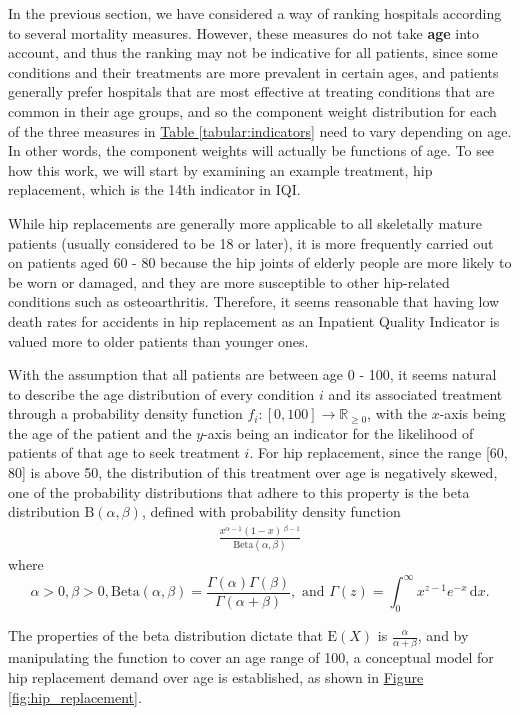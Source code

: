 \documentclass{article}
\begin{document}
In the previous section, we have considered a way of ranking hospitals according to several mortality measures. However, these measures do not take \textbf{age} into account, and thus the ranking may not be indicative for all patients, since some conditions and their treatments are more prevalent in certain ages, and patients generally prefer hospitals that are most effective at treating conditions that are common in their age groups, and so the component weight distribution for each of the three measures in \hyperref[tabular:indicators]{Table \ref*{tabular:indicators}} need to vary depending on age. In other words, the component weights will actually be functions of age. To see how this work, we will start by examining an example treatment, hip replacement, which is the 14th indicator in IQI.

While hip replacements are generally more applicable to all skeletally mature patients (usually considered to be 18 or later), it is more frequently carried out on patients aged 60 - 80 because the hip joints of elderly people are more likely to be worn or damaged, and they are more susceptible to other hip-related conditions such as osteoarthritis. Therefore, it seems reasonable that having low death rates for accidents in hip replacement as an Inpatient Quality Indicator is valued more to older patients than younger ones.

With the assumption that all patients are between age 0 - 100, it seems natural to describe the age distribution of every condition $i$ and its associated treatment through a probability density function $f_i : [0,100] \to \mathbb{R}_{\ge 0}$, with the $x$-axis being the age of the patient and the $y$-axis being an indicator for the likelihood of patients of that age to seek treatment $i$. For hip replacement, since the range [60, 80] is above 50, the distribution of this treatment over age is negatively skewed, one of the probability distributions that adhere to this property is the beta distribution $\mathrm{B}\left(\alpha, \beta\right)$, defined with probability density function
\begin{gather}\frac{x^{\alpha-1}(1-x)\,^{\beta-1}}{\mathrm{Beta}\left(\alpha,\beta\right)}\end{gather}
where
$$\alpha > 0, \beta > 0, \mathrm{Beta}\left(\alpha, \beta\right) = \frac{\Gamma\left(\alpha\right) \Gamma\left(\beta\right)}{\Gamma\left(\alpha + \beta\right)}, \text{ and } \Gamma(z) = \int_0^\infty x^{z-1}e^{-x}\,\mathrm{d}x.$$

The properties of the beta distribution dictate that $\mathrm{E}(X)$ is $\frac{\alpha}{\alpha + \beta}$, and by manipulating the function to cover an age range of 100, a conceptual model for hip replacement demand over age is established, as shown in \hyperref[fig:hip_replacement]{Figure \ref*{fig:hip_replacement}}.
\end{document}
